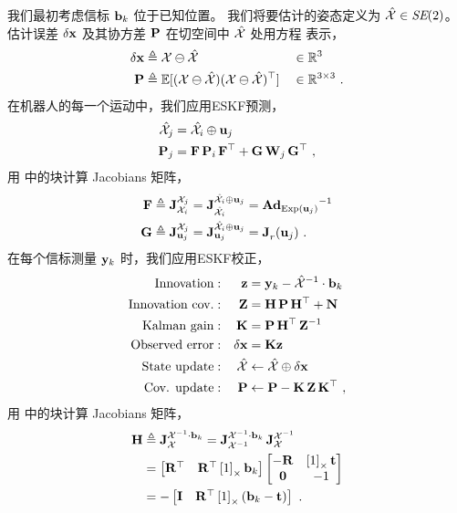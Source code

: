 我们最初考虑信标 ${\bf b}_k$ 位于已知位置。 
我们将要估计的姿态定义为 $\hat{\mathcal{X}}\in\textit{SE}(2)$。
估计误差 ${\delta{\bf x}}$ 及其协方差 ${\bf P}$ 在切空间中 $\hat{\mathcal{X}}$ 处用方程  表示，
%
\begin{align}\label{equ:loc_Gaussian}
{\delta{\bf x}} &\triangleq \mathcal{X}\ominus\hat{\mathcal{X}} && \in{\mathbb R}^3
\\
{\bf P} &\triangleq {\mathbb E}[(\mathcal{X}\ominus\hat{\mathcal{X}})(\mathcal{X}\ominus\hat{\mathcal{X}})^{\top}]&& \in{\mathbb R}^{3\times3}
~.
\end{align}
%
在机器人的每一个运动中，我们应用ESKF预测，
%
\begin{align}
\hat{\mathcal{X}}_j &= \hat{\mathcal{X}}_i\oplus{\bf u}_j \label{equ:loc_ekf_pred}
\\
{\bf P}_j &= {\bf F}\,{\bf P}_i\,{\bf F}^{\top} + {\bf G}\,{\bf W}_j\,{\bf G}^{\top}
~,
\end{align}
%
用  中的块计算 Jacobians 矩阵，
%
\begin{align*}
{\bf F} &\triangleq {{\bf J}^{\mathcal{X}_j}_{\mathcal{X}_i}} = {{\bf J}^{\hat{\mathcal{X}}_i\oplus{\bf u}_j}_{\hat{\mathcal{X}}_i}} 
= {\mathbf{Ad}_{\operatorname*{Exp}({\bf u}_j)}}^{-1}
\\
{\bf G} &\triangleq {{\bf J}^{\mathcal{X}_j}_{{\bf u}_j}} = {{\bf J}^{\hat{\mathcal{X}}_i\oplus{\bf u}_j}_{{\bf u}_j}} = {{\bf J}^{}_{r}}({\bf u}_j)
~.
\end{align*}
%
在每个信标测量 ${\bf y}_k$ 时，我们应用ESKF校正，
%
\begin{align}
\textrm{Innovation}&:&{\bf z} &= {\bf y}_k - \hat{\mathcal{X}}^{-1}\cdot{\bf b}_k \notag\\
\textrm{Innovation cov.}&:&{\bf Z} &= {\bf H}\,{\bf P}\,{\bf H}^{\top}+{\bf N} \notag\\
\textrm{Kalman gain}&:&{\bf K} &= {\bf P}\,{\bf H}^{\top}\,{\bf Z}^{-1} \notag\\
\textrm{Observed error}&:&{\delta{\bf x}} &= {\bf K}{\bf z} \notag\\
\textrm{State update}&:&\hat{\mathcal{X}} &\gets \hat{\mathcal{X}} \oplus {\delta{\bf x}} \label{equ:loc_ekf_corr}\\
\textrm{Cov. update}&:&{\bf P} &\gets {\bf P} - {\bf K}\,{\bf Z}\,{\bf K}^{\top}
~,
\end{align}
%
用  中的块计算 Jacobians 矩阵，
\begin{align*}
{\bf H} 
&\triangleq {{\bf J}^{\mathcal{X}^{-1}\cdot{\bf b}_k}_{\mathcal{X}}}= {{\bf J}^{\mathcal{X}^{-1}\cdot{\bf b}_k}_{\mathcal{X}^{-1}}}\,{{\bf J}^{\mathcal{X}^{-1}}_{\mathcal{X}}} 
\notag\\
&= 
\begin{bmatrix}{\bf R}^{\top} & {\bf R}^{\top}\left[1\right]_\times{\bf b}_k\end{bmatrix}
\begin{bmatrix}
-{\bf R} & \left[1\right]_\times{\bf t} \\ \bf0 & -1
\end{bmatrix}
\notag\\
&=
-\begin{bmatrix}{\bf I} & {\bf R}^{\top}\left[1\right]_\times({\bf b}_k-{\bf t})\end{bmatrix}
~.
\end{align*}

